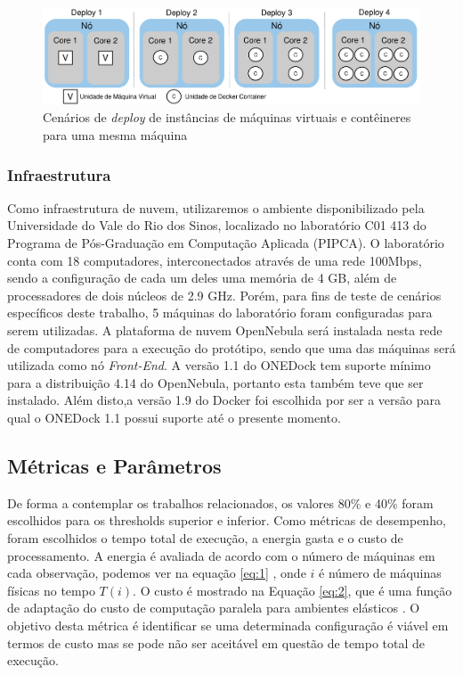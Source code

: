 \documentclass[twoside,english,brazilian]{UNISINOSartigo}
\begin{document}
\begin{figure}[ht!]
	\caption{Cenários de \textit{deploy} de instâncias de máquinas virtuais e contêineres para uma mesma máquina}
	\label{fig:deploy}
	\centering%
	\begin{minipage}{0.8\textwidth}
		\includegraphics[width=\textwidth]{images/deploy}
	\end{minipage}
\end{figure}

\subsubsection{Infraestrutura}

Como infraestrutura de nuvem, utilizaremos o ambiente disponibilizado pela Universidade do Vale do Rio dos Sinos, localizado no laboratório C01 413 do Programa de Pós-Graduação em Computação Aplicada (PIPCA). O laboratório conta com 18 computadores, interconectados através de uma rede 100Mbps, sendo a configuração de cada um deles uma memória de 4 GB, além de processadores de dois núcleos de 2.9 GHz. Porém, para fins de teste de cenários específicos deste trabalho, 5 máquinas do laboratório foram configuradas para serem utilizadas. A plataforma de nuvem OpenNebula será instalada nesta rede de computadores para a execução do protótipo, sendo que uma das máquinas será utilizada como nó \textit{Front-End}. 
A versão 1.1 do ONEDock tem suporte mínimo para a distribuição 4.14 do OpenNebula, portanto esta também teve que ser instalado. Além disto,a versão 1.9 do Docker foi escolhida por ser a versão para qual o ONEDock 1.1 possui suporte até o presente momento. 

\subsection{Métricas e Parâmetros}

De forma a contemplar os trabalhos relacionados, os valores 80\% e 40\% foram escolhidos para os thresholds superior e inferior. Como métricas de desempenho, foram escolhidos o tempo total de execução, a energia gasta e o custo de processamento. A energia é avaliada de acordo com o número de máquinas em cada observação, podemos ver na equação \ref{eq:1} , onde \(i\) é número de máquinas físicas no tempo \(T(i)\).  O custo é mostrado na Equação \ref{eq:2}, que é uma função de adaptação do custo de computação paralela para ambientes elásticos \cite{Barry2004}. O objetivo desta métrica é identificar se uma determinada configuração é viável em termos de custo mas se pode não ser aceitável em questão de tempo total de execução. 
\end{document}
